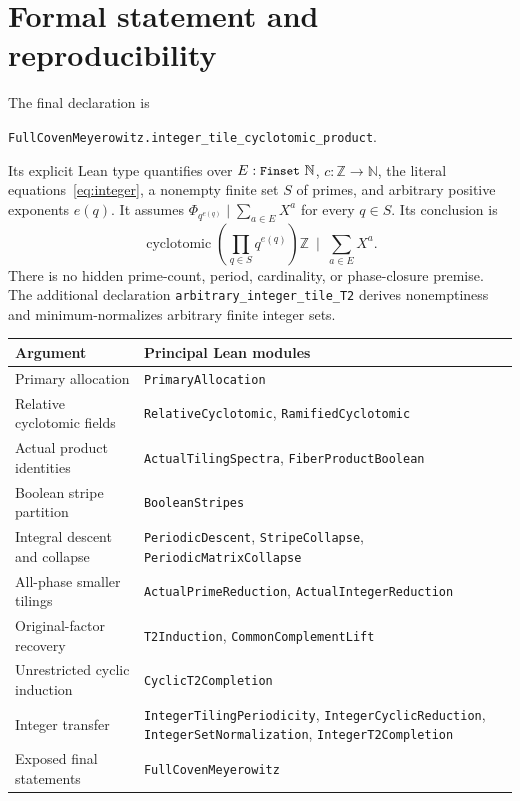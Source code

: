 \documentclass[11pt]{article}
\newcommand{\Z}{\mathbb Z}
\newcommand{\PhiC}{\Phi}
\newcommand{\code}[1]{\texttt{\small #1}}
\begin{document}
\appendix
\section{Formal statement and reproducibility}\label{app:formal}
The final declaration is
\begin{center}
\code{FullCovenMeyerowitz.integer\_tile\_cyclotomic\_product}.
\end{center}
Its explicit Lean type quantifies over $E:\code{Finset}\ \mathbb N$, $c:\Z\to\mathbb N$, the literal equations~\eqref{eq:integer}, a nonempty finite set $S$ of primes, and arbitrary positive exponents $e(q)$. It assumes $\PhiC_{q^{e(q)}}\mid\sum_{a\in E}X^a$ for every $q\in S$. Its conclusion is
\[
 \operatorname{cyclotomic}\!\left(\prod_{q\in S}q^{e(q)}\right)\Z
 \ \mid\ \sum_{a\in E}X^a.
\]
There is no hidden prime-count, period, cardinality, or phase-closure premise. The additional declaration \code{arbitrary\_integer\_tile\_T2} derives nonemptiness and minimum-normalizes arbitrary finite integer sets.

\small
\begin{center}
\begin{tabular}{>{\raggedright\arraybackslash}p{}>{\raggedright\arraybackslash}p{}}
\textbf{Argument} & \textbf{Principal Lean modules}\\\hline
Primary allocation & \code{PrimaryAllocation}\\
Relative cyclotomic fields & \code{RelativeCyclotomic}, \code{RamifiedCyclotomic}\\
Actual product identities & \code{ActualTilingSpectra}, \code{FiberProductBoolean}\\
Boolean stripe partition & \code{BooleanStripes}\\
Integral descent and collapse & \code{PeriodicDescent}, \code{StripeCollapse}, \code{PeriodicMatrixCollapse}\\
All-phase smaller tilings & \code{ActualPrimeReduction}, \code{ActualIntegerReduction}\\
Original-factor recovery & \code{T2Induction}, \code{CommonComplementLift}\\
Unrestricted cyclic induction & \code{CyclicT2Completion}\\
Integer transfer & \code{IntegerTilingPeriodicity}, \code{IntegerCyclicReduction}, \code{IntegerSetNormalization}, \code{IntegerT2Completion}\\
Exposed final statements & \code{FullCovenMeyerowitz}\\\hline
\end{tabular}
\end{center}
\normalsize
\end{document}
